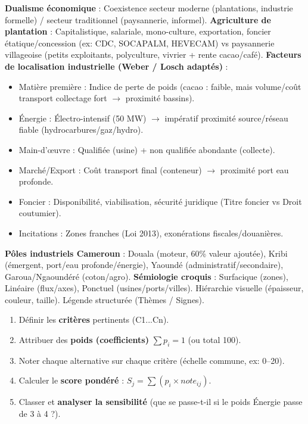 \documentclass[11pt]{article}
\newcommand{\cle}[1]{{\popxbold\color{popdark}#1}}
\newcounter{popsec}
\newcounter{popsub}
\newcommand{\courssub}[1]{%
  \stepcounter{popsub}%
  \par\vspace{9pt}\noindent{\popxbold\fontsize{11.5}{13}\selectfont\color{popink}{\color{poporange}\thepopsec.\thepopsub}\hspace{6pt}#1}\par\nopagebreak\vspace{4pt}
}
\begin{document}
\courssub{Ressources à mobiliser}
\begin{aretenir}
    \textbf{Dualisme économique} : Coexistence secteur moderne (plantations, industrie formelle) / secteur traditionnel (paysannerie, informel).
    \textbf{Agriculture de plantation} : Capitalistique, salariale, mono-culture, exportation, foncier étatique/concession (ex: CDC, SOCAPALM, HEVECAM) vs paysannerie villageoise (petits exploitants, polyculture, vivrier + rente cacao/café).
    \textbf{Facteurs de localisation industrielle (Weber / Losch adaptés)} :
    \begin{itemize}
        \item \cle{Matière première} : Indice de perte de poids (cacao : faible, mais volume/coût transport collectage fort $\rightarrow$ proximité bassins).
        \item \cle{Énergie} : \cle{Électro-intensif} (50 MW) $\rightarrow$ impératif proximité source/réseau fiable (hydrocarbures/gaz/hydro).
        \item \cle{Main-d'œuvre} : Qualifiée (usine) + non qualifiée abondante (collecte).
        \item \cle{Marché/Export} : Coût transport final (conteneur) $\rightarrow$ proximité port eau profonde.
        \item \cle{Foncier} : Disponibilité, viabilisation, sécurité juridique (Titre foncier vs Droit coutumier).
        \item \cle{Incitations} : Zones franches (Loi 2013), exonérations fiscales/douanières.
    \end{itemize}
    \textbf{Pôles industriels Cameroun} : Douala (moteur, 60\% valeur ajoutée), Kribi (émergent, port/eau profonde/énergie), Yaoundé (administratif/secondaire), Garoua/Ngaoundéré (coton/agro).
    \textbf{Sémiologie croquis} : Surfacique (zones), Linéaire (flux/axes), Ponctuel (usines/ports/villes). Hiérarchie visuelle (épaisseur, couleur, taille). Légende structurée (Thèmes / Signes).
\end{aretenir}

\begin{methode}
    \begin{enumerate}
        \item Définir les \textbf{critères} pertinents (C1...Cn).
        \item Attribuer des \textbf{poids (coefficients)} $\sum p_i = 1$ (ou total 100).
        \item Noter chaque alternative sur chaque critère (échelle commune, ex: 0--20).
        \item Calculer le \textbf{score pondéré} : $S_j = \sum (p_i \times note_{ij})$.
        \item Classer et \textbf{analyser la sensibilité} (que se passe-t-il si le poids Énergie passe de 3 à 4 ?).
    \end{enumerate}
\end{methode}
\end{document}
